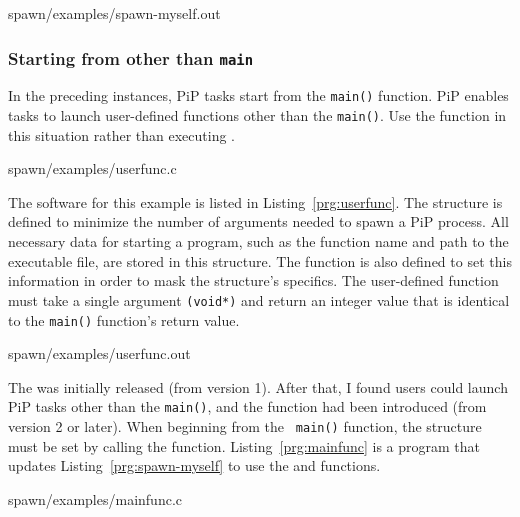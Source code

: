 
                {spawn/examples/spawn-myself.out}

\subsubsection{Starting from other than {\tt main}}\label{sec:spawn-func}

In the preceding instances, PiP tasks start from the {\tt main()}
function. PiP enables tasks to launch user-defined functions other
than the {\tt main()}. Use the  function in this
situation rather than executing . 

 {spawn/examples/userfunc.c}

The software for this example is listed in
Listing~\ref{prg:userfunc}. The 
structure is defined to minimize the number of arguments 
needed to spawn a PiP process. All necessary data for starting a
program, such as the function name and path to the executable file,
are stored in this structure. The 
function is also defined to set this information in order to mask the
structure's specifics. The user-defined function must take a single
argument {\tt (void*)} and return an integer value that is identical
to the {\tt main()} function's return value.

 {spawn/examples/userfunc.out}

The  was initially released (from version
1). After that, I found users could launch PiP tasks other than the
{\tt main()}, and the  function had been
introduced (from version 2 or later). When beginning from the {\tt
  main()} function, the  structure must
be set by calling the  function.  
Listing~\ref{prg:mainfunc} is a program that updates
Listing~\ref{prg:spawn-myself} to use the 
and  functions.  


                {spawn/examples/mainfunc.c}

